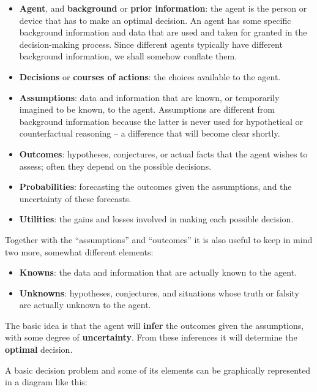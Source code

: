 \documentclass[
  a4paper,
  DIV=11,
  numbers=noendperiod,
  oneside]{scrreprt}
\begin{document}
\begin{itemize}
\item
  {\textbf{Agent}}, and {\textbf{background}} or {\textbf{prior
  information}}: the agent is the person or device that has to make an
  optimal decision. An agent has some specific background information
  and data that are used and taken for granted in the decision-making
  process. Since different agents typically have different background
  information, we shall somehow conflate them.
\item
  {\textbf{Decisions}} or {\textbf{courses of actions}}: the choices
  available to the agent.
\item
  {\textbf{Assumptions}}: data and information that are known, or
  temporarily imagined to be known, to the agent. Assumptions are
  different from background information because the latter is never used
  for hypothetical or counterfactual reasoning -- a difference that will
  become clear shortly.
\item
  {\textbf{Outcomes}}: hypotheses, conjectures, or actual facts that the
  agent wishes to assess; often they depend on the possible decisions.
\item
  {\textbf{Probabilities}}: forecasting the outcomes given the
  assumptions, and the uncertainty of these forecasts.
\item
  {\textbf{Utilities}}: the gains and losses involved in making each
  possible decision.
\end{itemize}

Together with the ``assumptions'' and ``outcomes'' it is also useful to
keep in mind two more, somewhat different elements:

\begin{itemize}
\item
  {\textbf{Knowns}}: the data and information that are actually known to
  the agent.
\item
  {\textbf{Unknowns}}: hypotheses, conjectures, and situations whose
  truth or falsity are actually unknown to the agent.
\end{itemize}

The basic idea is that the agent will {\textbf{infer}} the outcomes
given the assumptions, with some degree of {\textbf{uncertainty}}. From
these inferences it will determine the {\textbf{optimal}} decision.

A basic decision problem and some of its elements can be graphically
represented in a diagram like this:
\end{document}
